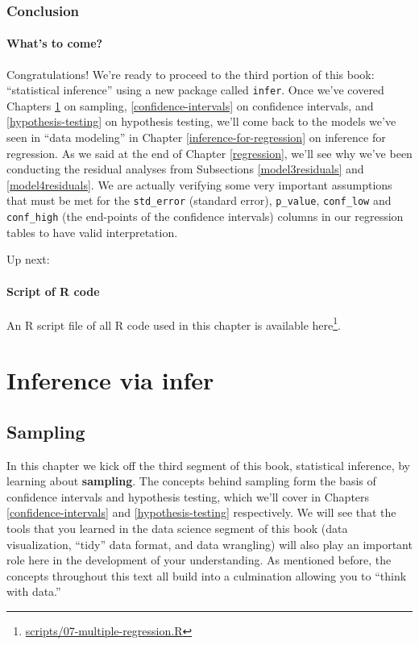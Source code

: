 \documentclass[12pt,]{krantz}
\renewcommand{\href}[2]{#2\footnote{\url{#1}}}
\begin{document}
\section{Conclusion}\label{conclusion-5}

\subsection{What's to come?}\label{whats-to-come-4}

Congratulations! We're ready to proceed to the third portion of this
book: ``statistical inference'' using a new package called
\texttt{infer}. Once we've covered Chapters \ref{sampling} on sampling,
\ref{confidence-intervals} on confidence intervals, and
\ref{hypothesis-testing} on hypothesis testing, we'll come back to the
models we've seen in ``data modeling'' in Chapter
\ref{inference-for-regression} on inference for regression. As we said
at the end of Chapter \ref{regression}, we'll see why we've been
conducting the residual analyses from Subsections \ref{model3residuals}
and \ref{model4residuals}. We are actually verifying some very important
assumptions that must be met for the \texttt{std\_error} (standard
error), \texttt{p\_value}, \texttt{conf\_low} and \texttt{conf\_high}
(the end-points of the confidence intervals) columns in our regression
tables to have valid interpretation.

Up next:

\subsection{Script of R code}\label{script-of-r-code-4}

An R script file of all R code used in this chapter is available
\href{scripts/07-multiple-regression.R}{here}.

\part{Inference via infer}\label{part-inference-via-infer}

\chapter{Sampling}\label{sampling}

In this chapter we kick off the third segment of this book, statistical
inference, by learning about \textbf{sampling}. The concepts behind
sampling form the basis of confidence intervals and hypothesis testing,
which we'll cover in Chapters \ref{confidence-intervals} and
\ref{hypothesis-testing} respectively. We will see that the tools that
you learned in the data science segment of this book (data
visualization, ``tidy'' data format, and data wrangling) will also play
an important role here in the development of your understanding. As
mentioned before, the concepts throughout this text all build into a
culmination allowing you to ``think with data.''
\end{document}
